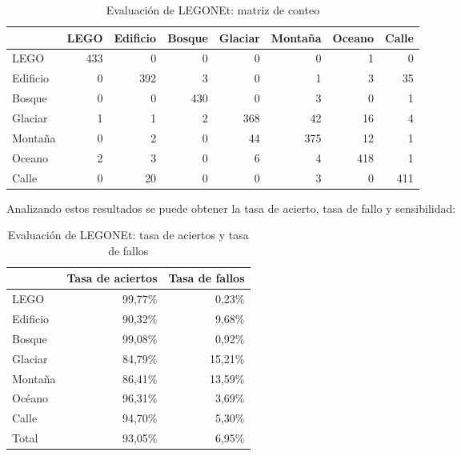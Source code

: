 \begin{table}[ht]
  \centering
    \begin{tabular}{|l|r|r|r|r|r|r|r|}
\cline{2-8}    \multicolumn{1}{r|}{} & \multicolumn{1}{l|}{LEGO} & \multicolumn{1}{l|}{Edificio} & \multicolumn{1}{l|}{Bosque} & \multicolumn{1}{l|}{Glaciar} & \multicolumn{1}{l|}{Montaña} & \multicolumn{1}{l|}{Oceano} & \multicolumn{1}{l|}{Calle} \\
    \hline
    LEGO  & 433   & 0     & 0     & 0     & 0     & 1     & 0 \\
    \hline
    Edificio & 0     & 392   & 3     & 0     & 1     & 3     & 35 \\
    \hline
    Bosque & 0     & 0     & 430   & 0     & 3     & 0     & 1 \\
    \hline
    Glaciar & 1     & 1     & 2     & 368   & 42    & 16    & 4 \\
    \hline
    Montaña & 0     & 2     & 0     & 44    & 375   & 12    & 1 \\
    \hline
    Oceano & 2     & 3     & 0     & 6     & 4     & 418   & 1 \\
    \hline
    Calle & 0     & 20    & 0     & 0     & 3     & 0     & 411 \\
    \hline
    \end{tabular}%
  \label{tab:LEGONet results}%
  \caption{Evaluación de LEGONEt: matriz de conteo}
\end{table}%

Analizando estos resultados se puede obtener la tasa de acierto, tasa de fallo y sensibilidad:

\begin{table}[!ht]
  \centering
    \begin{tabular}{|l|r|r|}
\cline{2-3}    \multicolumn{1}{r|}{} & \multicolumn{1}{l|}{Tasa de aciertos} & \multicolumn{1}{l|}{Tasa de fallos} \\
    \hline
    LEGO  & 99,77\% & 0,23\% \\
    \hline
    Edificio & 90,32\% & 9,68\% \\
    \hline
    Bosque & 99,08\% & 0,92\% \\
    \hline
    Glaciar & 84,79\% & 15,21\% \\
    \hline
    Montaña & 86,41\% & 13,59\% \\
    \hline
    Océano & 96,31\% & 3,69\% \\
    \hline
    Calle & 94,70\% & 5,30\% \\
    \hline
    Total & 93,05\% & 6,95\% \\
    \hline
    \end{tabular}%
  \label{tab:LEGONet results2}%
  \caption{Evaluación de LEGONEt: tasa de aciertos y tasa de fallos}
\end{table}%

